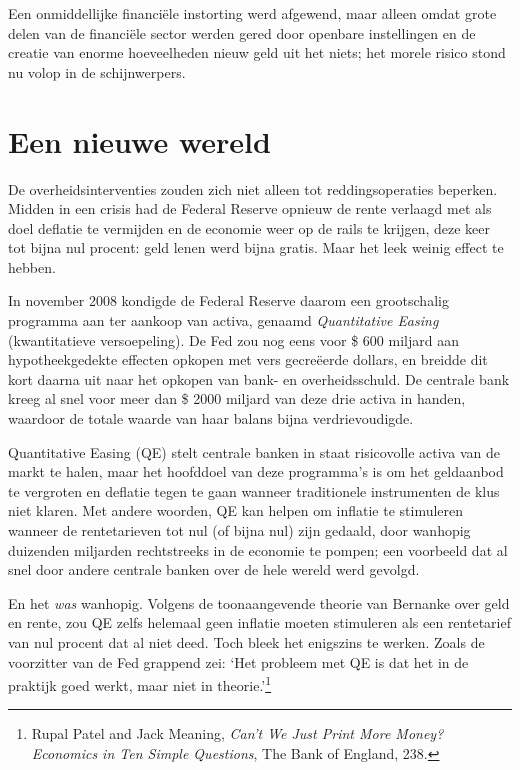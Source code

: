 \documentclass[
  a5paper,
  smalldemyvopaper,11pt,twoside,onecolumn,openright,extrafontsizes,
hidelinks]{memoir}
\begin{document}
Een onmiddellijke financiële instorting werd afgewend, maar alleen omdat
grote delen van de financiële sector werden gered door openbare
instellingen en de creatie van enorme hoeveelheden nieuw geld uit het
niets; het morele risico stond nu volop in de schijnwerpers.

\section{Een nieuwe wereld}\label{een-nieuwe-wereld}

De overheidsinterventies zouden zich niet alleen tot reddingsoperaties
beperken. Midden in een crisis had de Federal Reserve opnieuw de rente
verlaagd met als doel deflatie te vermijden en de economie weer op de
rails te krijgen, deze keer tot bijna nul procent: geld lenen werd bijna
gratis. Maar het leek weinig effect te hebben.

In november 2008 kondigde de Federal Reserve daarom een grootschalig
programma aan ter aankoop van activa, genaamd \emph{Quantitative Easing}
(kwantitatieve versoepeling). De Fed zou nog eens voor \$ 600 miljard
aan hypotheekgedekte effecten opkopen met vers gecreëerde dollars, en
breidde dit kort daarna uit naar het opkopen van bank- en
overheidsschuld. De centrale bank kreeg al snel voor meer dan \$ 2000
miljard van deze drie activa in handen, waardoor de totale waarde van
haar balans bijna verdrievoudigde.

Quantitative Easing (QE) stelt centrale banken in staat risicovolle
activa van de markt te halen, maar het hoofddoel van deze programma's is
om het geldaanbod te vergroten en deflatie tegen te gaan wanneer
traditionele instrumenten de klus niet klaren. Met andere woorden, QE
kan helpen om inflatie te stimuleren wanneer de rentetarieven tot nul
(of bijna nul) zijn gedaald, door wanhopig duizenden miljarden
rechtstreeks in de economie te pompen; een voorbeeld dat al snel door
andere centrale banken over de hele wereld werd gevolgd.

En het \emph{was} wanhopig. Volgens de toonaangevende theorie van
Bernanke over geld en rente, zou QE zelfs helemaal geen inflatie moeten
stimuleren als een rentetarief van nul procent dat al niet deed. Toch
bleek het enigszins te werken. Zoals de voorzitter van de Fed grappend
zei: `Het probleem met QE is dat het in de praktijk goed werkt, maar
niet in theorie.'\footnote{Rupal Patel and Jack Meaning, \emph{Can't We
  Just Print More Money? Economics in Ten Simple Questions}, The Bank of
  England, 238.}
\end{document}
